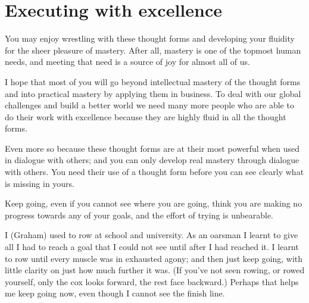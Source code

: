 \section{Executing with excellence}
You may enjoy wrestling with these thought forms and developing your fluidity for the sheer pleasure of mastery. After all, mastery is one of the topmost human needs, and meeting that need is a source of joy for almost all of us.


I hope that most of you will go beyond intellectual mastery of the thought forms and into practical mastery by applying them in business. To deal with our global challenges and build a better world we need many more people who are able to do their work with excellence because they are highly fluid in all the thought forms.


Even more so because these thought forms are at their most powerful when used in dialogue with others; and you can only develop real mastery through dialogue with others. You need their use of a thought form before you can see clearly what is missing in yours.


Keep going, even if you cannot see where you are going, think you are making no progress towards any of your goals, and the effort of trying is unbearable.


I (Graham) used to row at school and university. As an oarsman I learnt to give all I had to reach a goal that I could not see until after I had reached it. I learnt to row until every muscle was in exhausted agony; and then just keep going, with little clarity on just how much further it was. (If you’ve not seen rowing, or rowed yourself, only the cox looks forward, the rest face backward.) Perhaps that helps me keep going now, even though I cannot see the finish line.
